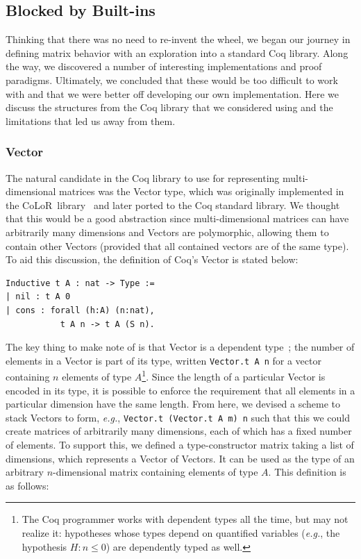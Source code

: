 \documentclass[11pt,conference]{IEEEtran}
\newcommand{\colorlib}{CoLoR}
\theoremstyle{plain} %
\theoremstyle{definition}
\theoremstyle{remark}
\begin{document}
\subsection{Blocked by Built-ins}

Thinking that there was no need to re-invent the wheel, we began our journey in
defining matrix behavior with an exploration into a standard Coq library. Along
the way, we discovered a number of interesting implementations and proof
paradigms. Ultimately, we concluded that these would be too difficult to work
with and that we were better off developing our own implementation. Here we
discuss the structures from the Coq library that we considered using and the
limitations that led us away from them.

\subsubsection{Vector}

The natural candidate in the Coq library to use for representing
multi-dimensional matrices was the \textsf{Vector} type, which was originally
implemented in the \colorlib\ library~\cite{BLANQUI_2011} and later ported to
the Coq standard library. We thought that this would be a good abstraction since
multi-dimensional matrices can have arbitrarily many dimensions and
\textsf{Vector}s are polymorphic, allowing them to contain other
\textsf{Vector}s (provided that all contained vectors are of the same type). To
aid this discussion, the definition of Coq's \textsf{Vector} is stated below:

\begin{verbatim}
Inductive t A : nat -> Type :=
| nil : t A 0
| cons : forall (h:A) (n:nat),
           t A n -> t A (S n).
\end{verbatim}

The key thing to make note of is that \textsf{Vector} is a dependent
type~\cite{Bove2009,Thorsten_2010}; the number of elements in a \textsf{Vector}
is part of its type, written \texttt{Vector.t A n} for a vector containing \(n\)
elements of type \(A\)\footnote{The Coq programmer works with dependent types
all the time, but may not realize it: hypotheses whose types depend on
quantified variables (\textit{e.g.}, the hypothesis \(H: n \le 0\)) are
dependently typed as well.}. Since the length of a particular \textsf{Vector} is
encoded in its type, it is possible to enforce the requirement that all elements
in a particular dimension have the same length. From here, we devised a scheme
to stack \textsf{Vector}s to form, \emph{e.g.}, \texttt{Vector.t (Vector.t A m)
n} such that this we could create matrices of arbitrarily many dimensions, each
of which has a fixed number of elements. To support this, we defined a
type-constructor \textsf{matrix} taking a list of dimensions, which represents a
\textsf{Vector} of \textsf{Vector}s. It can be used as the type of an arbitrary
\(n\)-dimensional matrix containing elements of type \(A\). This definition is
as follows:
\end{document}
